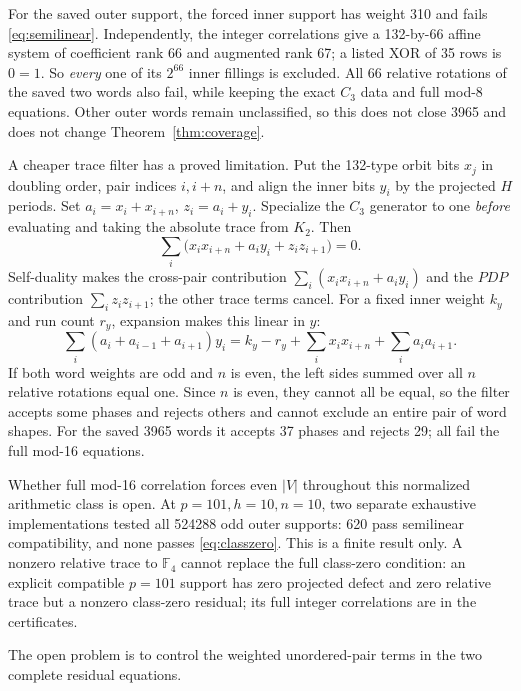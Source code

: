 \documentclass[11pt]{article}
\theoremstyle{definition}
\theoremstyle{remark}
\begin{document}
For the saved outer support, the forced inner support has weight 310 and
fails \eqref{eq:semilinear}. Independently, the integer correlations give a
132-by-66 affine system of coefficient rank 66 and augmented rank 67; a
listed XOR of 35 rows is $0=1$. So \emph{every} one of its $2^{66}$ inner
fillings is excluded. All 66 relative rotations of the saved two words also
fail, while keeping the exact $C_3$ data and full mod-8 equations. Other
outer words remain unclassified, so this does not close 3965 and does not
change Theorem~\ref{thm:coverage}.

A cheaper trace filter has a proved limitation. Put the 132-type
orbit bits $x_j$ in doubling order, pair indices $i,i+n$, and align the
inner bits $y_i$ by the projected $H$ periods. Set $a_i=x_i+x_{i+n}$,
$z_i=a_i+y_i$. Specialize the $C_3$ generator to one \emph{before}
evaluating and taking the absolute trace from $K_2$. Then
\begin{equation}\label{eq:trace-filter}
 \sum_i\bigl(x_ix_{i+n}+a_iy_i+z_iz_{i+1}\bigr)=0.
\end{equation}
Self-duality makes the cross-pair contribution
$\sum_i(x_ix_{i+n}+a_iy_i)$ and the $PDP$ contribution
$\sum_i z_iz_{i+1}$; the other trace terms cancel. For a fixed inner
weight $k_y$ and run count $r_y$, expansion makes this linear in $y$:
\[
 \sum_i(a_i+a_{i-1}+a_{i+1})y_i
 =k_y-r_y+\sum_i x_ix_{i+n}+\sum_i a_ia_{i+1}.
\]
If both word weights are odd and $n$ is even, the left sides summed over
all $n$ relative rotations equal one. Since $n$ is even, they cannot all
be equal, so the filter accepts some phases and rejects others and cannot
exclude an entire pair of word shapes. For the saved 3965 words it accepts
37 phases and rejects 29; all fail the full mod-16 equations.

Whether full mod-16 correlation forces even $|V|$ throughout this
normalized arithmetic class is open. At $p=101,h=10,n=10$, two separate
exhaustive implementations tested all 524288 odd outer supports: 620 pass
semilinear compatibility, and none passes \eqref{eq:classzero}. This is a
finite result only. A nonzero relative trace to $\mathbb F_4$ cannot
replace the full class-zero condition: an explicit compatible $p=101$
support has zero projected defect and zero relative trace but a nonzero
class-zero residual; its full integer correlations are in the
certificates.

The open problem is to control the weighted unordered-pair terms in the
two complete residual equations.

\end{document}
